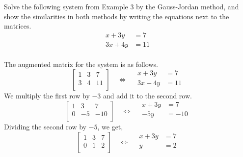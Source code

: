 \begin{example}
    Solve the following system from Example 3 by the Gauss-Jordan method, and show the similarities in both methods by writing the equations next to the matrices.
    \[
        \begin{aligned}
            x + 3y  & = 7  \\
            3x + 4y & = 11 \\
        \end{aligned}
    \]
\end{example}
\begin{solution}
    The augmented matrix for the system is as follows.
    \[
        \left[
            \begin{array}{cc|c}
                1 & 3 & 7  \\
                3 & 4 & 11 \\
            \end{array}
            \right]
        \quad \Leftrightarrow \quad
        \begin{aligned}
            x + 3y  & = 7  \\
            3x + 4y & = 11 \\
        \end{aligned}
    \]
    We multiply the first row by $-3$ and add it to the second row.
    \[
        \left[
            \begin{array}{cc|c}
                1 & 3  & 7   \\
                0 & -5 & -10 \\
            \end{array}
            \right]
        \quad \Leftrightarrow \quad
        \begin{aligned}
            x + 3y & = 7   \\
            -5y    & = -10 \\
        \end{aligned}
    \]
    Dividing the second row by $-5$, we get,
    \[
        \left[
            \begin{array}{cc|c}
                1 & 3 & 7 \\
                0 & 1 & 2 \\
            \end{array}
            \right]
        \quad \Leftrightarrow \quad
        \begin{aligned}
            x + 3y & = 7 \\
            y      & = 2 \\
        \end{aligned}
\]
\end{solution}
